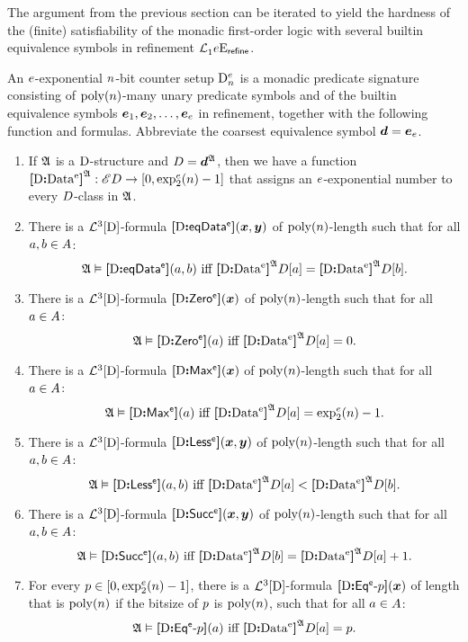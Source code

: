 The argument from the previous section can be iterated to yield the hardness of
the (finite) satisfiability of the monadic first-order logic with several
builtin equivalence symbols in refinement $\mathcal{L}^{{}}_{1}{e}\mathrm{E}_{\mathsf{refine}}$.

\begin{definition}
An $e$-exponential $n$-bit counter setup $\mathrm{D}_n^e$ is a monadic
predicate signature consisting of $\operatorname{poly}(n)$-many unary predicate symbols and of
the builtin equivalence symbols $\bm{e}_{1},\bm{e}_{2},\dots,\bm{e}_{e}$ in refinement,
together with the following function and formulas. Abbreviate the coarsest
equivalence symbol $\bm{d} = \bm{e}_{e}$.
\begin{enumerate}
  \item If $\mathfrak{A}$ is a $\mathrm{D}$-structure and $D = \bm{d}^{\mathfrak{A}}$, then we have
  a function ${\bm{[}\mathrm{D}\mathord{\bm{:}}\mathrm{Data^{e}}\bm{]}}^{\mathfrak{A}} : {\mathscr{E}D} \to [0, \exp_{2}^{e}(n) - 1]$ that
  assigns an $e$-exponential number to every $D$-class in $\mathfrak{A}$.
  \item There is a $\mathcal{L}^{3}[\mathrm{D}]$-formula ${\bm{[}\mathrm{D}\mathord{\bm{:}}\mathsf{eqData^{e}}\bm{]}}(\bm{x},\bm{y})$ of
  $\operatorname{poly}(n)$-length such that for all $a,b \in A$:
  \[
    \miff{
      \StrA \vDash \feeqData\sze\DS(\ea,\eb)}{
      \eData\sze\DS\StrA\relD[\ea] = \eData\sze\DS\StrA\relD[\eb]}.
  \]
  \item There is a $\mathcal{L}^{3}[\mathrm{D}]$-formula ${\bm{[}\mathrm{D}\mathord{\bm{:}}\mathsf{Zero^{e}}\bm{]}}(\bm{x})$ of
  $\operatorname{poly}(n)$-length such that for all $a \in A$:
  \[
    \miff{
      \StrA \vDash \feZero\sze\DS(\ea)}{
      \eData\sze\DS\StrA\relD[\ea] = 0}.
  \]
  \item There is a $\mathcal{L}^{3}[\mathrm{D}]$-formula ${\bm{[}\mathrm{D}\mathord{\bm{:}}\mathsf{Max^{e}}\bm{]}}(\bm{x})$ of
  $\operatorname{poly}(n)$-length such that for all $a \in A$:
  \[
    \miff{
      \StrA \vDash \feMax\sze\DS(\ea)}{
      \eData\sze\DS\StrA\relD[\ea] = \tetr\sze2\nn - 1}.
  \]
  \item There is a $\mathcal{L}^{3}[\mathrm{D}]$-formula ${\bm{[}\mathrm{D}\mathord{\bm{:}}\mathsf{Less^{e}}\bm{]}}(\bm{x},\bm{y})$ of
  $\operatorname{poly}(n)$-length such that for all $a, b \in A$:
  \[
    \miff{
      \StrA \vDash \feLess\sze\DS(\ea,\eb)}{
      \eData\sze\DS\StrA\relD[\ea] < \eData\sze\DS\StrA\relD[\eb]}.
  \]
  \item There is a $\mathcal{L}^{3}[\mathrm{D}]$-formula ${\bm{[}\mathrm{D}\mathord{\bm{:}}\mathsf{Succ^{e}}\bm{]}}(\bm{x},\bm{y})$ of
  $\operatorname{poly}(n)$-length such that for all $a, b \in A$:
  \[
    \miff{
      \StrA \vDash \feSucc\sze\DS(\ea,\eb)}{
      \eData\sze\DS\StrA\relD[\eb] = \eData\sze\DS\StrA\relD[\ea] + 1}.
  \]
  \item For every $p \in [0, \exp_{2}^{e}(n) - 1]$, there is a
  $\mathcal{L}^{3}[\mathrm{D}]$-formula ${\bm{[}\mathrm{D}\mathord{\bm{:}}\mathsf{Eq^{e}}{\hbox{-}}p\bm{]}}(\bm{x})$ of length that is $\operatorname{poly}(n)$
  if the bitsize of $p$ is $\operatorname{poly}(n)$, such that for all $a \in  A$:
  \[
    \miff{
      \StrA \vDash \feEq\sze\posp\DS(\ea)}{
      \eData\sze\DS\StrA\relD[\ea] = \posp}.
  \]
  
\end{enumerate}
\end{definition}
